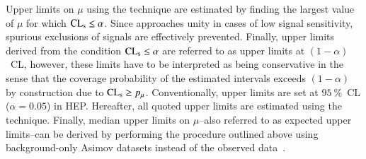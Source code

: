 Upper limits on $\mu$ using the \CLs technique are estimated by finding the
largest value of $\mu$ for which $\text{CL}_{\text{s}} \leq \alpha$. Since \CLs approaches unity
in cases of low signal sensitivity, spurious exclusions of signals are
effectively prevented. Finally, upper limits derived from the condition
$\text{CL}_{\text{s}} \leq \alpha$ are referred to as upper limits at $(1 - \alpha)$~CL,
however, these limits have to be interpreted as being conservative in the sense
that the coverage probability of the estimated intervals exceeds $(1 - \alpha)$
by construction due to $\text{CL}_{\text{s}} \geq p_\mu$. Conventionally, upper limits are set
at $\SI{95}{\percent}$~CL ($\alpha = 0.05$) in HEP. Hereafter, all quoted upper
limits are estimated using the \CLs technique. Finally, median upper limits on
$\mu$--also referred to as expected upper limits--can be derived by performing
the procedure outlined above using background-only Asimov datasets instead of
the observed data~\cite{Cowan:2010js}.


